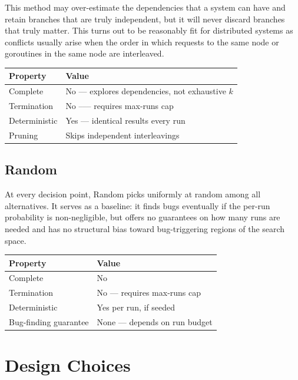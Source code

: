 \documentclass[11pt]{article}
\begin{document}
This method may over-estimate the dependencies that a system can have and retain branches that are truly independent, but it will never discard branches that truly matter. This turns out to be reasonably fit for distributed systems as conflicts usually arise when the order in which requests to the same node or goroutines in the same node are interleaved. 

\begin{center}
\begin{tabular}{@{}ll@{}}
\toprule
Property & Value \\
\midrule
Complete & No --- explores dependencies, not exhaustive $k$ \\
Termination & No ––– requires max-runs cap \\
Deterministic & Yes --- identical results every run \\
Pruning & Skips independent interleavings \\
\bottomrule
\end{tabular}
\end{center}

\subsection{Random}

At every decision point, Random picks uniformly at random among all alternatives. It serves as a baseline: it finds bugs eventually if the per-run probability is non-negligible, but offers no guarantees on how many runs are needed and has no structural bias toward bug-triggering regions of the search space.

\begin{center}
\begin{tabular}{@{}ll@{}}
\toprule
Property & Value \\
\midrule
Complete & No \\
Termination & No --- requires max-runs cap \\
Deterministic & Yes per run, if seeded \\
Bug-finding guarantee & None --- depends on run budget \\
\bottomrule
\end{tabular}
\end{center}

\section{Design Choices}
\end{document}

